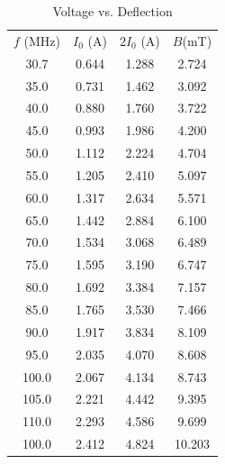 \documentclass{amsart}
\begin{document}
\begin{table}[H]
    \centering
    \caption{Voltage vs. Deflection}
    \bigskip \bigskip
    \label{table:deflection}
    \begin{tabular}{c|c|c|c}
        $f$ (MHz)&$I_0$ (A) &$2I_0$ (A) &$B$(mT) \\
        30.7     & 0.644    & 1.288     & 2.724  \\
        35.0     & 0.731    & 1.462     & 3.092  \\
        40.0     & 0.880    & 1.760     & 3.722  \\
        45.0     & 0.993    & 1.986     & 4.200  \\
        50.0     & 1.112    & 2.224     & 4.704  \\
        55.0     & 1.205    & 2.410     & 5.097  \\
        60.0     & 1.317    & 2.634     & 5.571  \\
        65.0     & 1.442    & 2.884     & 6.100  \\
        70.0     & 1.534    & 3.068     & 6.489  \\
        75.0     & 1.595    & 3.190     & 6.747  \\
        80.0     & 1.692    & 3.384     & 7.157  \\
        85.0     & 1.765    & 3.530     & 7.466  \\
        90.0     & 1.917    & 3.834     & 8.109  \\
        95.0     & 2.035    & 4.070     & 8.608  \\
        100.0    & 2.067    & 4.134     & 8.743  \\
        105.0    & 2.221    & 4.442     & 9.395  \\
        110.0    & 2.293    & 4.586     & 9.699  \\
        100.0    & 2.412    & 4.824     & 10.203
    \end{tabular}
\end{table}
%
\end{document}
